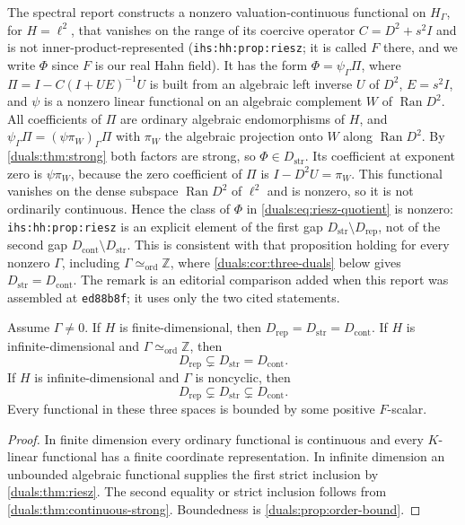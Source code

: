 \documentclass[11pt,letterpaper]{article}
\numberwithin{equation}{section}
\theoremstyle{definition}
\theoremstyle{remark}
\newcommand{\Z}{\mathbb Z}
\newcommand{\HG}{H_\Gamma}
\newcommand{\Dstr}{D_{\mathrm{str}}}
\newcommand{\Dcont}{D_{\mathrm{cont}}}
\newcommand{\Drep}{D_{\mathrm{rep}}}
\newcommand{\cyc}{\Gamma\simeq_{\mathrm{ord}}\Z}
\newcommand{\ihs}[1]{\texttt{ihs:#1}}
\begin{document}
\begin{remark}\label{duals:rem:ihs-riesz}
The spectral report constructs a nonzero valuation-continuous functional
on $\HG$, for $H=\ell^2$, that vanishes on the range of its coercive
operator $C=D^2+s^2I$ and is not inner-product-represented
(\ihs{hh:prop:riesz}; it is called $F$ there, and we write $\Phi$ since $F$
is our real Hahn field). It has the form $\Phi=\psi_\Gamma\Pi$, where
$\Pi=I-C(I+UE)^{-1}U$ is built from an algebraic left inverse $U$ of
$D^2$, $E=s^2I$, and $\psi$ is a nonzero linear functional on an algebraic
complement $W$ of $\operatorname{Ran}D^2$. All coefficients of $\Pi$ are
ordinary algebraic endomorphisms of $H$, and $\psi_\Gamma\Pi=
(\psi\pi_W)_\Gamma\Pi$ with $\pi_W$ the algebraic projection onto $W$
along $\operatorname{Ran}D^2$. By \cref{duals:thm:strong} both factors
are strong, so $\Phi\in\Dstr$. Its coefficient at exponent zero is
$\psi\pi_W$, because the zero coefficient of $\Pi$ is $I-D^2U=\pi_W$.
This functional vanishes on the dense subspace $\operatorname{Ran}D^2$ of
$\ell^2$ and is nonzero, so it is not ordinarily continuous. Hence the
class of $\Phi$ in \eqref{duals:eq:riesz-quotient} is nonzero:
\ihs{hh:prop:riesz} is an explicit element of the first gap
$\Dstr\setminus\Drep$, not of the second gap $\Dcont\setminus\Dstr$. This
is consistent with that proposition holding for every nonzero $\Gamma$,
including $\cyc$, where \cref{duals:cor:three-duals} below gives
$\Dstr=\Dcont$. The remark is an editorial comparison added when this
report was assembled at \texttt{ed88b8f}; it uses only the two cited statements.
\end{remark}

\begin{corollary}\label{duals:cor:three-duals}
Assume $\Gamma\ne0$.
If $H$ is finite-dimensional, then
$\Drep=\Dstr=\Dcont$.
If $H$ is infinite-dimensional and $\cyc$, then
\[
 \Drep\subsetneq\Dstr=\Dcont.
\]
If $H$ is infinite-dimensional and $\Gamma$ is noncyclic, then
\begin{equation}\label{duals:eq:strict-three}
 \Drep\subsetneq\Dstr\subsetneq\Dcont.
\end{equation}
Every functional in these three spaces is bounded by some positive
$F$-scalar.
\end{corollary}
\begin{proof}
In finite dimension every ordinary functional is continuous and every
$K$-linear functional has a finite coordinate representation.
In infinite dimension an unbounded algebraic functional supplies the
first strict inclusion by \cref{duals:thm:riesz}. The second equality or
strict inclusion follows from \cref{duals:thm:continuous-strong}.
Boundedness is \cref{duals:prop:order-bound}.
\end{proof}
\end{document}
